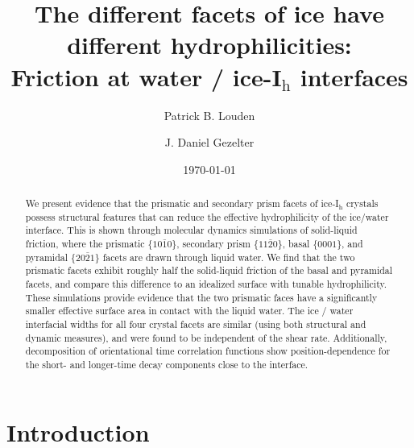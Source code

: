 \documentclass[aps,jcp,preprint,showpacs,superscriptaddress,groupedaddress]{revtex4}  %
\begin{document}
\title{The different facets of ice have different hydrophilicities: \\
  Friction at water / ice-I$_\mathrm{h}$ interfaces}
\author{Patrick B. Louden}
\author{J. Daniel Gezelter}

\date{\today}


\begin{abstract}
  We present evidence that the prismatic and secondary prism facets of
  ice-I$_\mathrm{h}$ crystals possess structural features that can
  reduce the effective hydrophilicity of the ice/water interface. 
  This is shown through molecular dynamics simulations of solid-liquid
  friction, where the prismatic
  $\{10\bar{1}0\}$, secondary prism $\{11\bar{2}0\}$, basal $\{0001\}$, 
  and pyramidal $\{20\bar{2}1\}$ facets are drawn through liquid water.  
  We find that the two prismatic facets exhibit roughly half 
  the solid-liquid friction of the basal and pyramidal facets, and compare
  this difference to an idealized surface with tunable hydrophilicity.
  These simulations provide evidence that the
  two prismatic faces have a significantly smaller effective surface
  area in contact with the liquid water. The ice / water interfacial
  widths for all four crystal facets are similar (using both
  structural and dynamic measures), and were found to be independent
  of the shear rate.  Additionally, decomposition of orientational
  time correlation functions show position-dependence for the short-
  and longer-time decay components close to the interface.
\end{abstract}

\maketitle

\section{Introduction}
\end{document}
